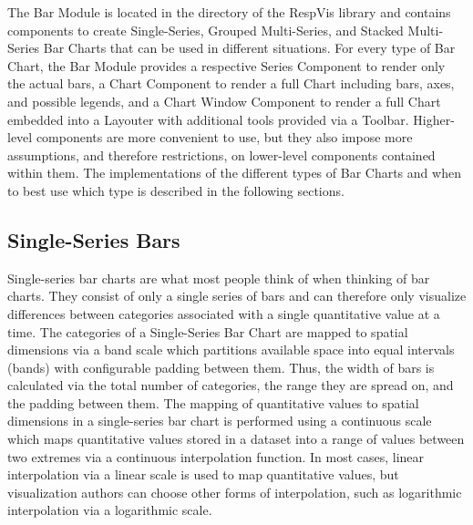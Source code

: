 The Bar Module is located in the  directory of the
RespVis library and contains components to create Single-Series,
Grouped Multi-Series, and Stacked Multi-Series Bar Charts that can be
used in different situations. For every type of Bar Chart, the Bar
Module provides a respective Series Component to render only the
actual bars, a Chart Component to render a full Chart including bars,
axes, and possible legends, and a Chart Window Component to render a
full Chart embedded into a Layouter with additional tools provided via
a Toolbar. Higher-level components are more convenient to use, but
they also impose more assumptions, and therefore restrictions, on
lower-level components contained within them. The implementations of
the different types of Bar Charts and when to best use which type is
described in the following sections.





\subsection{Single-Series Bars}

Single-series bar charts are what most people think of when thinking
of bar charts. They consist of only a single series of bars and can
therefore only visualize differences between categories associated
with a single quantitative value at a time. The categories of a
Single-Series Bar Chart are mapped to spatial dimensions via a band
scale which partitions available space into equal intervals (bands)
with configurable padding between them. Thus, the width of bars is
calculated via the total number of categories, the range they are
spread on, and the padding between them. The mapping of quantitative
values to spatial dimensions in a single-series bar chart is performed
using a continuous scale which maps quantitative values stored in a
dataset into a range of values between two extremes via a continuous
interpolation function. In most cases, linear interpolation via a
linear scale is used to map quantitative values, but visualization
authors can choose other forms of interpolation, such as logarithmic
interpolation via a logarithmic scale.

